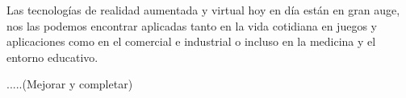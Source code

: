 
Las tecnologías de realidad aumentada y virtual hoy en día están en gran auge, nos las podemos encontrar aplicadas tanto en la vida cotidiana en juegos y aplicaciones como en el comercial e industrial o incluso en la medicina y el entorno educativo.
 

.....(Mejorar y completar)


